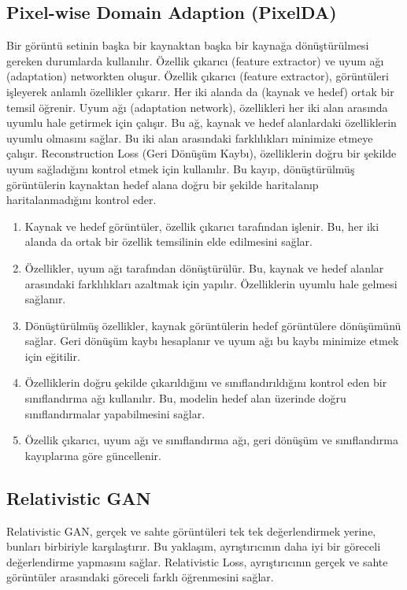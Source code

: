 \subsection{Pixel-wise Domain Adaption (PixelDA)}

Bir görüntü setinin başka bir kaynaktan başka bir kaynağa dönüştürülmesi gereken durumlarda kullanılır. Özellik çıkarıcı (feature extractor) ve uyum ağı (adaptation) networkten oluşur. Özellik çıkarıcı (feature extractor), görüntüleri işleyerek anlamlı özellikler çıkarır. Her iki alanda da (kaynak ve hedef) ortak bir temsil öğrenir. Uyum ağı (adaptation network), özellikleri her iki alan arasında uyumlu hale getirmek için çalışır. Bu ağ, kaynak ve hedef alanlardaki özelliklerin uyumlu olmasını sağlar. Bu iki alan arasındaki farklılıkları minimize etmeye çalışır.  Reconstruction Loss (Geri Dönüşüm Kaybı), özelliklerin doğru bir şekilde uyum sağladığını kontrol etmek için kullanılır. Bu kayıp, dönüştürülmüş görüntülerin kaynaktan hedef alana doğru bir şekilde haritalanıp haritalanmadığını kontrol eder. 

\begin{enumerate}
    \item Kaynak ve hedef görüntüler, özellik çıkarıcı tarafından işlenir. Bu, her iki alanda da ortak bir özellik temsilinin elde edilmesini sağlar.
    \item Özellikler, uyum ağı tarafından dönüştürülür. Bu, kaynak ve hedef alanlar arasındaki farklılıkları azaltmak için yapılır. Özelliklerin uyumlu hale gelmesi sağlanır.
    \item Dönüştürülmüş özellikler, kaynak görüntülerin hedef görüntülere dönüşümünü sağlar. Geri dönüşüm kaybı hesaplanır ve uyum ağı bu kaybı minimize etmek için eğitilir.
    \item Özelliklerin doğru şekilde çıkarıldığını ve sınıflandırıldığını kontrol eden bir sınıflandırma ağı kullanılır. Bu, modelin hedef alan üzerinde doğru sınıflandırmalar yapabilmesini sağlar.
    \item Özellik çıkarıcı, uyum ağı ve sınıflandırma ağı, geri dönüşüm ve sınıflandırma kayıplarına göre güncellenir.
\end{enumerate}

\subsection{Relativistic GAN}

Relativistic GAN, gerçek ve sahte görüntüleri tek tek değerlendirmek yerine, bunları birbiriyle karşılaştırır. Bu yaklaşım, ayrıştırıcının daha iyi bir göreceli değerlendirme yapmasını sağlar. Relativistic Loss, ayrıştırıcının gerçek ve sahte görüntüler arasındaki göreceli farklı öğrenmesini sağlar.

